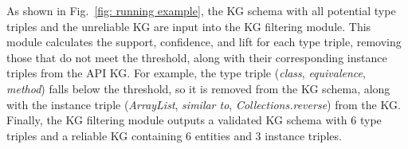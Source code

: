 As shown in Fig.~\ref{fig: running example}, the KG schema with all potential type triples and the unreliable KG are input into the KG filtering module. 
This module calculates the support, confidence, and lift for each type triple, removing those that do not meet the threshold, along with their corresponding instance triples from the API KG.
For example, the type triple (\textit{class}, \textit{equivalence}, \textit{method}) falls below the threshold, so it is removed from the KG schema, along with the instance triple (\textit{ArrayList}, \textit{similar to}, \textit{Collections.reverse}) from the KG. 
Finally, the KG filtering module outputs a validated KG schema with 6 type triples and a reliable KG containing 6 entities and 3 instance triples.

